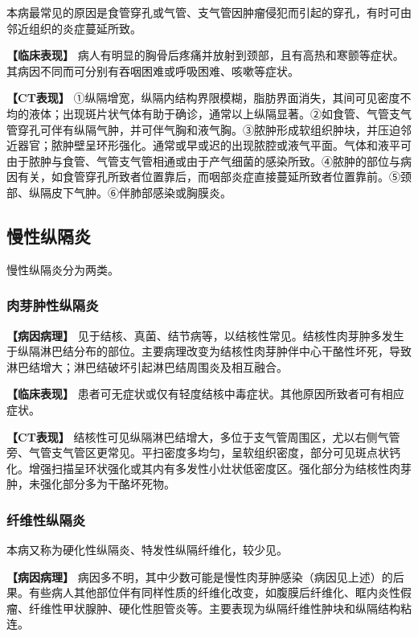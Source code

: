 本病最常见的原因是食管穿孔或气管、支气管因肿瘤侵犯而引起的穿孔，有时可由邻近组织的炎症蔓延所致。

\textbf{【临床表现】}
病人有明显的胸骨后疼痛并放射到颈部，且有高热和寒颤等症状。其病因不同而可分别有吞咽困难或呼吸困难、咳嗽等症状。

\textbf{【CT表现】}
①纵隔增宽，纵隔内结构界限模糊，脂肪界面消失，其间可见密度不均的液体；出现斑片状气体有助于确诊，通常以上纵隔显著。②如食管、气管支气管穿孔可伴有纵隔气肿，并可伴气胸和液气胸。③脓肿形成软组织肿块，并压迫邻近器官；脓肿壁呈环形强化。通常或早或迟的出现脓腔或液气平面。气体和液平可由于脓肿与食管、气管支气管相通或由于产气细菌的感染所致。④脓肿的部位与病因有关，如食管穿孔所致者位置靠后，而咽部炎症直接蔓延所致者位置靠前。⑤颈部、纵隔皮下气肿。⑥伴肺部感染或胸膜炎。

\subsection{慢性纵隔炎}

慢性纵隔炎分为两类。

\subsubsection{肉芽肿性纵隔炎}

\textbf{【病因病理】}
见于结核、真菌、结节病等，以结核性常见。结核性肉芽肿多发生于纵隔淋巴结分布的部位。主要病理改变为结核性肉芽肿伴中心干酪性坏死，导致淋巴结增大；淋巴结破坏引起淋巴结周围炎及相互融合。

\textbf{【临床表现】}
患者可无症状或仅有轻度结核中毒症状。其他原因所致者可有相应症状。

\textbf{【CT表现】}
结核性可见纵隔淋巴结增大，多位于支气管周围区，尤以右侧气管旁、气管支气管区更常见。平扫密度多均匀，呈软组织密度，部分可见斑点状钙化。增强扫描呈环状强化或其内有多发性小灶状低密度区。强化部分为结核性肉芽肿，未强化部分多为干酪坏死物。

\subsubsection{纤维性纵隔炎}

本病又称为硬化性纵隔炎、特发性纵隔纤维化，较少见。

\textbf{【病因病理】}
病因多不明，其中少数可能是慢性肉芽肿感染（病因见上述）的后果。有些病人其他部位伴有同样性质的纤维化改变，如腹膜后纤维化、眶内炎性假瘤、纤维性甲状腺肿、硬化性胆管炎等。主要表现为纵隔纤维性肿块和纵隔结构粘连。

